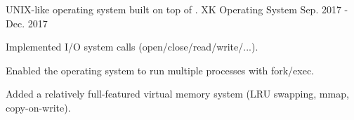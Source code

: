 \begin{cventries}
  \cventry
    {UNIX-like operating system built on top of \href{https://pdos.csail.mit.edu/6.828/2012/xv6.html}{\color{awesome-skyblue}{xv6}}.} %
    {XK Operating System} %
    {} %
    {Sep. 2017 - Dec. 2017} %
    {
      \begin{cvitems} %
        \item{Implemented I/O system calls (open/close/read/write/...).}
        \item{Enabled the operating system to run multiple processes with fork/exec.}
        \item{Added a relatively full-featured virtual memory system (LRU swapping, mmap, copy-on-write).}
      \end{cvitems}
    }
\end{cventries}